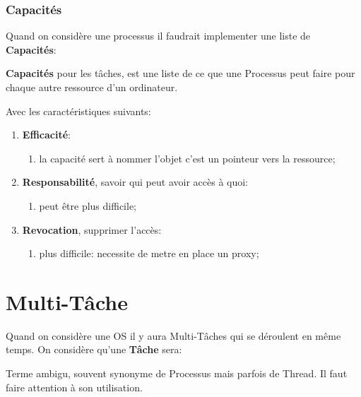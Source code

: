 \documentclass{article}
\begin{document}
\subsubsection*{Capacités}
Quand on considère une processus il faudrait implementer une liste de \textbf{Capacités}:
\begin{definition}
    \textbf{Capacités} pour les tâches, est une liste de ce que une Processus peut faire pour chaque autre ressource d'un ordinateur.
\end{definition}
Avec les caractéristiques suivants:
\begin{enumerate}
    \item \textbf{Efficacité}:
    \begin{enumerate}[noitemsep]
        \item la capacité sert à nommer l'objet c'est un pointeur vers la ressource;
    \end{enumerate}

    \item \textbf{Responsabilité}, savoir qui peut avoir accès à quoi:
    \begin{enumerate}[noitemsep]
        \item peut être plus difficile;
    \end{enumerate}

    \item \textbf{Revocation}, supprimer l'accès:
    \begin{enumerate}[noitemsep]
        \item plus difficile: necessite de metre en place un proxy;
    \end{enumerate}
\end{enumerate}


\section{Multi-Tâche}

Quand on considère une OS il y aura Multi-Tâches qui se déroulent en même temps. On considère qu'une \textbf{Tâche} sera: 
\begin{definition}\label{def:tache}
    Terme ambigu, souvent synonyme de Processus mais parfois de Thread. Il faut faire attention à son utilisation.
\end{definition}
\end{document}
